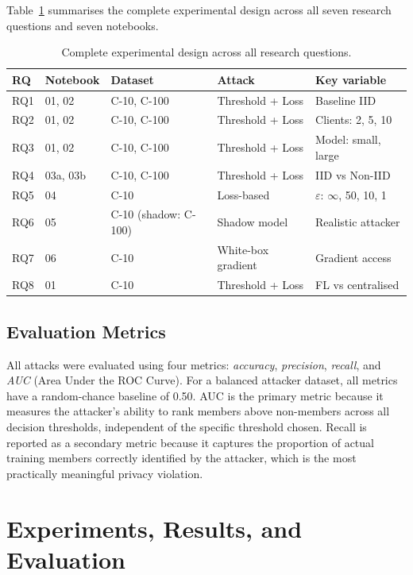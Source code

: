 \documentclass[12pt, a4paper]{report}
\begin{document}
Table~\ref{tab:exp_design} summarises the complete experimental design across all
seven research questions and seven notebooks.

\begin{table}[H]
  \centering
  \caption{Complete experimental design across all research questions.}
  \label{tab:exp_design}
  \begin{tabular}{lllll}
    \toprule
    \textbf{RQ} & \textbf{Notebook} & \textbf{Dataset} & \textbf{Attack} & \textbf{Key variable} \\
    \midrule
    RQ1 & 01, 02 & C-10, C-100 & Threshold + Loss & Baseline IID \\
    RQ2 & 01, 02 & C-10, C-100 & Threshold + Loss & Clients: 2, 5, 10 \\
    RQ3 & 01, 02 & C-10, C-100 & Threshold + Loss & Model: small, large \\
    RQ4 & 03a, 03b & C-10, C-100 & Threshold + Loss & IID vs Non-IID \\
    RQ5 & 04 & C-10 & Loss-based & $\varepsilon$: $\infty$, 50, 10, 1 \\
    RQ6 & 05 & C-10 (shadow: C-100) & Shadow model & Realistic attacker \\
    RQ7 & 06 & C-10 & White-box gradient & Gradient access \\
    RQ8 & 01 & C-10 & Threshold + Loss & FL vs centralised \\
    \bottomrule
  \end{tabular}
\end{table}

\section{Evaluation Metrics}

All attacks were evaluated using four metrics: \textit{accuracy}, \textit{precision},
\textit{recall}, and \textit{AUC} (Area Under the ROC Curve). For a balanced
attacker dataset, all metrics have a random-chance baseline of 0.50. AUC is the
primary metric because it measures the attacker's ability to rank members above
non-members across all decision thresholds, independent of the specific threshold
chosen. Recall is reported as a secondary metric because it captures the proportion
of actual training members correctly identified by the attacker, which is the most
practically meaningful privacy violation.

\chapter{Experiments, Results, and Evaluation}
\end{document}
